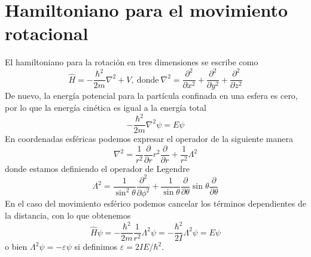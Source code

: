 \documentclass{tufte-handout}
\begin{document}
\section{Hamiltoniano para el movimiento rotacional}
El hamiltoniano para la rotación en tres
dimensiones se escribe como
\begin{equation}
    \hat{H}=-\frac{\hbar^2}{2m}\nabla^2 +V,
    \mathrm{~ donde~}
    \nabla^2=\frac{\partial^2}{\partial x^2} + \frac{\partial^2}{\partial y^2} +\frac{\partial^2}{\partial z^2}
\end{equation}
De nuevo, la energía potencial para la partícula confinada
en una esfera es cero, por lo que la energía cinética es
igual a la energía total
\begin{equation}
    -\frac{\hbar^2}{2m}\nabla^2\psi=E\psi
\end{equation}
En coordenadas esféricas podemos expresar el operador
de la siguiente manera
\begin{equation}
    \nabla^2=\frac{1}{r^2}\frac{\partial}{\partial r}r^2\frac{\partial}{\partial r} + \frac{1}{r^2}\Lambda^2
\end{equation}
donde estamos definiendo el operador de Legendre
\begin{equation}
    \Lambda^2=\frac{1}{\sin^2\theta}\frac{\partial^2}{\partial\phi^2}+
    \frac{1}{\sin\theta}\frac{\partial}{\partial\theta}\sin\theta\frac{\partial}{\partial\theta}
\end{equation}
En el caso del movimiento esférico podemos cancelar los 
términos dependientes de la distancia, con lo que obtenemos
\begin{equation}
\hat{H}\psi=-\frac{\hbar^2}{2m}\frac{1}{r^2}\Lambda^2\psi=-\frac{\hbar^2}{2I}\Lambda^2\psi=E\psi
\label{eq:rothamiltonian}
\end{equation}
o bien $\Lambda^2\psi=-\varepsilon\psi$ si definimos 
$\varepsilon=2IE/\hbar^2$.
\end{document}
